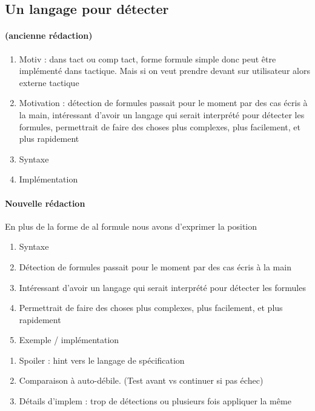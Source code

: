 \documentclass[titlepage,draft]{article}
\begin{document}
\subsection{Un langage pour détecter}

\paragraph{(ancienne rédaction)}
\begin{enumerate}

    \item Motiv : dans tact ou comp tact, forme formule simple donc peut être implémenté dans tactique. Mais si on veut prendre devant sur utilisateur alors externe tactique
    \item Motivation : détection de formules passait pour le moment par des cas écris à la main, intéressant d'avoir un langage qui serait interprété pour détecter les formules, permettrait de faire des choses plus complexes, plus facilement, et plus rapidement
    \item Syntaxe
    \item Implémentation
\end{enumerate}
\paragraph{Nouvelle rédaction}
En plus de la forme de al formule nous avons d'exprimer la position
\begin{enumerate}
    \item Syntaxe
    \item Détection de formules passait pour le moment par des cas écris à la main
    \item Intéressant d'avoir un langage qui serait interprété pour détecter les formules
    \item Permettrait de faire des choses plus complexes, plus facilement, et plus rapidement
    \item Exemple / implémentation
\end{enumerate}
\begin{enumerate}
    \item Spoiler : hint vers  le langage de spécification
    \item Comparaison à auto-débile. (Test avant vs continuer si pas échec)
    \item Détails d'implem : trop de détections ou plusieurs fois appliquer la même
\end{enumerate}
\end{document}
